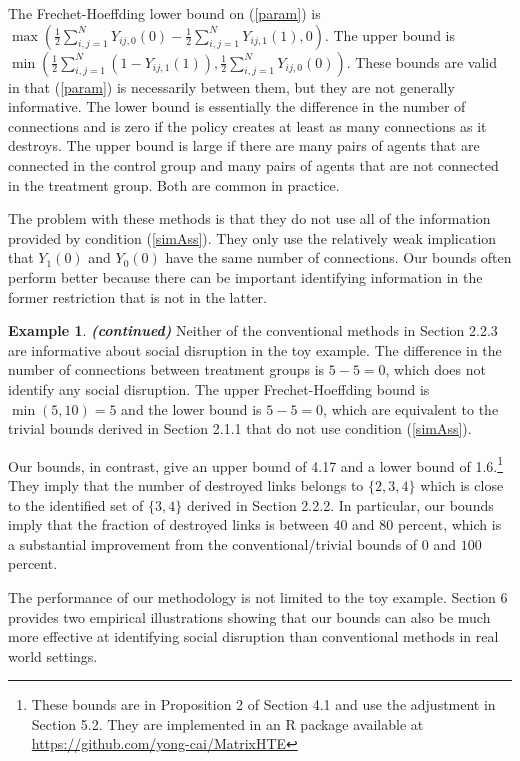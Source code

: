 \documentclass[12pt]{article}
\theoremstyle{definition}
\newtheorem{myexp}{Example}
\newenvironment{myexpcont}
{\addtocounter{myexp}{-1}\begin{myexp}{\textit{\textbf{{(continued)}}}}}
  {\end{myexp}}
\begin{document}
The Frechet-Hoeffding  lower bound on (\ref{param}) is $\max(\frac{1}{2}\sum_{i,j=1}^{N}Y_{ij,0}(0)- \frac{1}{2}\sum_{i,j=1}^{N}Y_{ij,1}(1),0)$. The upper bound is $\min(\frac{1}{2}\sum_{i,j=1}^{N}(1-Y_{ij,1}(1)),\frac{1}{2}\sum_{i,j=1}^{N}Y_{ij,0}(0))$. These bounds are valid in that (\ref{param}) is necessarily between them, but they are not generally informative. The lower bound is essentially the difference in the number of connections and is zero if the policy creates at least as many connections as it destroys. The upper bound is large if there are many pairs of agents that are connected in the control group and many pairs of agents that are not connected in the treatment group. Both are common in practice.   

The problem with these methods is that they do not use all of the information provided by condition (\ref{simAss}). They only use the relatively weak implication that $Y_{1}(0)$ and $Y_{0}(0)$ have the same number of connections. Our bounds often perform better because there can be important identifying information in the former restriction that is not in the latter.   



\begin{myexpcont}
Neither of the conventional methods in Section 2.2.3 are informative about social disruption in the toy example. The difference in the number of connections between treatment groups is $5 - 5 = 0$, which does not identify any social disruption. The upper Frechet-Hoeffding bound is $\min(5,10) = 5$ and the lower bound is $5 - 5 = 0$, which are equivalent to the trivial bounds derived in Section 2.1.1 that do not use condition (\ref{simAss}).  

Our bounds, in contrast, give an upper bound of 4.17 and a lower bound of 1.6.\footnote{These bounds are in Proposition 2 of Section 4.1 and use the adjustment in Section 5.2. They are implemented in an R package available at \url{https://github.com/yong-cai/MatrixHTE}} They imply that the number of destroyed links belongs to $\{2,3,4\}$ which is close to the identified set of $\{3,4\}$ derived in Section 2.2.2. In particular, our bounds imply that the fraction of destroyed links is between $40$ and $80$ percent, which is a substantial improvement from the conventional/trivial bounds of $0$ and $100$ percent.  \end{myexpcont}

The performance of our methodology is not limited to the toy example. Section 6 provides two empirical illustrations showing that our bounds can also be much more effective at identifying social disruption than conventional methods in real world settings. 
\end{document}
